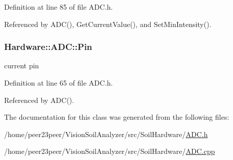 Definition at line 85 of file A\+D\+C.\+h.



Referenced by A\+D\+C(), Get\+Current\+Value(), and Set\+Min\+Intensity().

\hypertarget{class_hardware_1_1_a_d_c_acb6d23369c7047296af402ca480bb2f5}{}
\subsubsection[{Pin}]{ Hardware\+::\+A\+D\+C\+::\+Pin}\label{class_hardware_1_1_a_d_c_acb6d23369c7047296af402ca480bb2f5}
current pin 

Definition at line 65 of file A\+D\+C.\+h.



Referenced by A\+D\+C().



The documentation for this class was generated from the following files\+:\begin{DoxyCompactItemize}
\item 
/home/peer23peer/\+Vision\+Soil\+Analyzer/src/\+Soil\+Hardware/\hyperlink{_a_d_c_8h}{A\+D\+C.\+h}\item 
/home/peer23peer/\+Vision\+Soil\+Analyzer/src/\+Soil\+Hardware/\hyperlink{_a_d_c_8cpp}{A\+D\+C.\+cpp}\end{DoxyCompactItemize}
